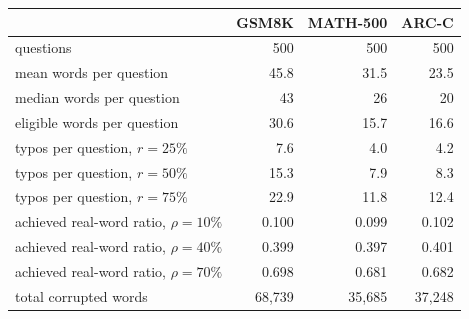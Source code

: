 \begin{tabular}{lrrr}
\toprule
 & GSM8K & MATH-500 & ARC-C \\
\midrule
questions & 500 & 500 & 500 \\
mean words per question & 45.8 & 31.5 & 23.5 \\
median words per question & 43 & 26 & 20 \\
eligible words per question & 30.6 & 15.7 & 16.6 \\
\midrule
typos per question, $r{=}25\%$ & 7.6 & 4.0 & 4.2 \\
typos per question, $r{=}50\%$ & 15.3 & 7.9 & 8.3 \\
typos per question, $r{=}75\%$ & 22.9 & 11.8 & 12.4 \\
\midrule
achieved real-word ratio, $\rho{=}10\%$ & 0.100 & 0.099 & 0.102 \\
achieved real-word ratio, $\rho{=}40\%$ & 0.399 & 0.397 & 0.401 \\
achieved real-word ratio, $\rho{=}70\%$ & 0.698 & 0.681 & 0.682 \\
\midrule
total corrupted words & 68{,}739 & 35{,}685 & 37{,}248 \\
\bottomrule
\end{tabular}
